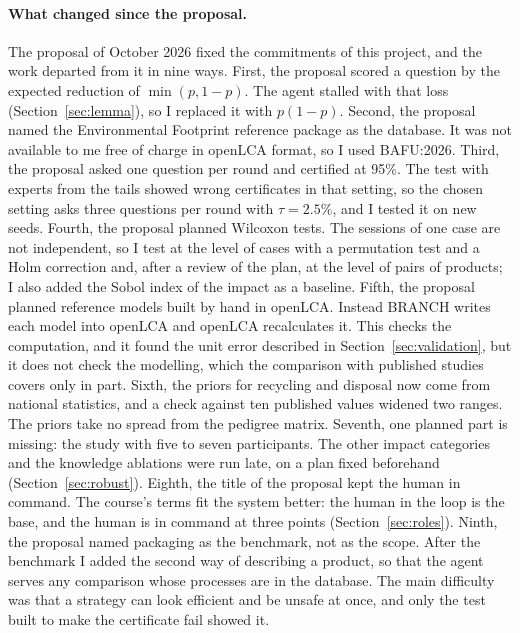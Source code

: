 \documentclass{article}
\begin{document}
\paragraph{What changed since the proposal.}
The proposal of October 2026 fixed the commitments of this project, and the work departed from it in nine
ways. First, the proposal scored a question by the expected reduction of $\min(p,1-p)$. The agent stalled
with that loss (Section~\ref{sec:lemma}), so I replaced it with $p(1-p)$. Second, the proposal named the
Environmental Footprint reference package as the database. It was not available to me free of charge in openLCA format, so I used BAFU:2026. Third, the proposal asked one question per round and certified at 95\%. The
test with experts from the tails showed \wFlipTailsOne{} wrong certificates in that setting, so the chosen
setting asks three questions per round with $\tau=2.5\%$, and I tested it on new seeds. Fourth, the
proposal planned Wilcoxon tests. The sessions of one case are not independent, so I test at the level of
cases with a permutation test and a Holm correction and, after a review of the plan, at the level of pairs of products; I also added the Sobol index of the impact as a
baseline. Fifth, the proposal planned reference models built by hand in openLCA. Instead BRANCH writes each
model into openLCA and openLCA recalculates it. This checks the computation, and it found the unit error
described in Section~\ref{sec:validation}, but it does not check the modelling, which the comparison
with published studies covers only in part. Sixth, the priors for recycling and disposal now come from national
statistics, and a check against ten published values widened two ranges. The priors take no spread from the pedigree matrix. Seventh, one planned part is missing: the study with five to seven participants. The other impact categories and the knowledge ablations were run late, on a plan
fixed beforehand (Section~\ref{sec:robust}). Eighth, the title of the proposal kept the human in command. The
course's terms fit the system better: the human in the loop is the base, and the human is in command at
three points (Section~\ref{sec:roles}). Ninth, the proposal named packaging as the benchmark, not as the scope. After the benchmark I added the second way of
describing a product, so that the agent serves any comparison whose processes are in the database. The main difficulty was that a strategy can look efficient and be
unsafe at once, and only the test built to make the certificate fail showed it.
\end{document}
